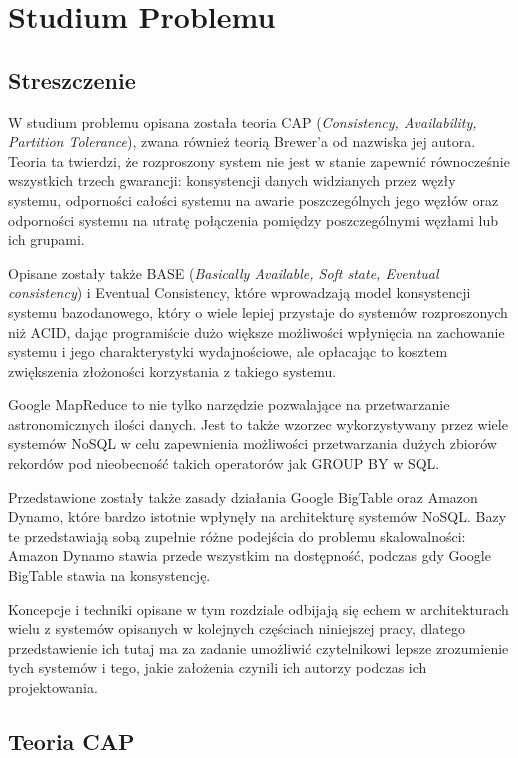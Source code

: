 \chapter{Studium Problemu}

\section*{Streszczenie}

W studium problemu opisana została teoria CAP (\emph{Consistency, Availability, Partition Tolerance}), zwana również teorią Brewer'a od nazwiska jej autora. 
Teoria ta twierdzi, że rozproszony system nie jest w stanie zapewnić równocześnie wszystkich trzech gwarancji: konsystencji danych widzianych przez węzły systemu, odporności całości systemu na awarie poszczególnych jego węzłów oraz odporności systemu na utratę połączenia pomiędzy poszczególnymi węzłami lub ich grupami. 

Opisane zostały także BASE (\emph{Basically Available, Soft state, Eventual consistency}) i Eventual Consistency, które wprowadzają model konsystencji systemu bazodanowego, który o wiele lepiej przystaje do systemów rozproszonych niż ACID, dając programiście dużo większe możliwości wpłynięcia na zachowanie systemu i jego charakterystyki wydajnościowe, ale opłacając to kosztem zwiększenia złożoności korzystania z takiego systemu.

Google MapReduce to nie tylko narzędzie pozwalające na przetwarzanie astronomicznych ilości danych.
Jest to także wzorzec wykorzystywany przez wiele systemów NoSQL w celu zapewnienia możliwości przetwarzania dużych zbiorów rekordów pod nieobecność takich operatorów jak GROUP BY w SQL.

Przedstawione zostały także zasady działania Google BigTable oraz Amazon Dynamo, które bardzo istotnie wpłynęły na architekturę systemów NoSQL. 
Bazy te przedstawiają sobą zupełnie różne podejścia do problemu skalowalności: Amazon Dynamo stawia przede wszystkim na dostępność, podczas gdy Google BigTable stawia na konsystencję.

Koncepcje i techniki opisane w tym rozdziale odbijają się echem w architekturach wielu z systemów opisanych w kolejnych częściach niniejszej pracy, dlatego przedstawienie ich tutaj ma za zadanie umożliwić czytelnikowi lepsze zrozumienie tych systemów i tego, jakie założenia czynili ich autorzy podczas ich projektowania.

\section{Teoria CAP}

